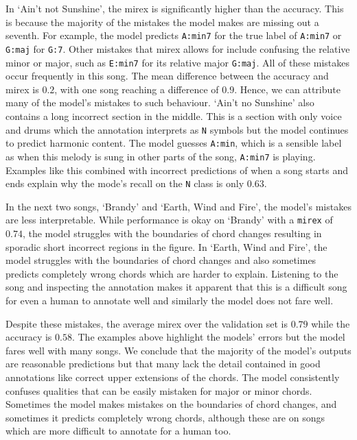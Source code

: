 In `Ain't not Sunshine', the mirex is significantly higher than the accuracy. This is because the majority of the mistakes the model makes are missing out a seventh. For example, the model predicts \texttt{A:min7} for the true label of \texttt{A:min7} or \texttt{G:maj} for \texttt{G:7}. Other mistakes that mirex allows for include confusing the relative minor or major, such as \texttt{E:min7} for its relative major \texttt{G:maj}. All of these mistakes occur frequently in this song. The mean difference between the accuracy and mirex is $0.2$, with one song reaching a difference of $0.9$. Hence, we can attribute many of the model's mistakes to such behaviour. `Ain't no Sunshine' also contains a long incorrect section in the middle. This is a section with only voice and drums which the annotation interprets as \texttt{N} symbols but the model continues to predict harmonic content. The model guesses \texttt{A:min}, which is a sensible label as when this melody is sung in other parts of the song, \texttt{A:min7} is playing. Examples like this combined with incorrect predictions of when a song starts and ends explain why the mode's recall on the \texttt{N} class is only $0.63$.

In the next two songs, `Brandy' and `Earth, Wind and Fire', the model's mistakes are less interpretable. While performance is okay on `Brandy' with a \texttt{mirex} of $0.74$, the model struggles with the boundaries of chord changes resulting in sporadic short incorrect regions in the figure. In `Earth, Wind and Fire', the model struggles with the boundaries of chord changes and also sometimes predicts completely wrong chords which are harder to explain. Listening to the song and inspecting the annotation makes it apparent that this is a difficult song for even a human to annotate well and similarly the model does not fare well.

Despite these mistakes, the average mirex over the validation set is $0.79$ while the accuracy is $0.58$. The examples above highlight the models' errors but the model fares well with many songs. We conclude that the majority of the model's outputs are reasonable predictions but that many lack the detail contained in good annotations like correct upper extensions of the chords. The model consistently confuses qualities that can be easily mistaken for major or minor chords. Sometimes the model makes mistakes on the boundaries of chord changes, and sometimes it predicts completely wrong chords, although these are on songs which are more difficult to annotate for a human too.

